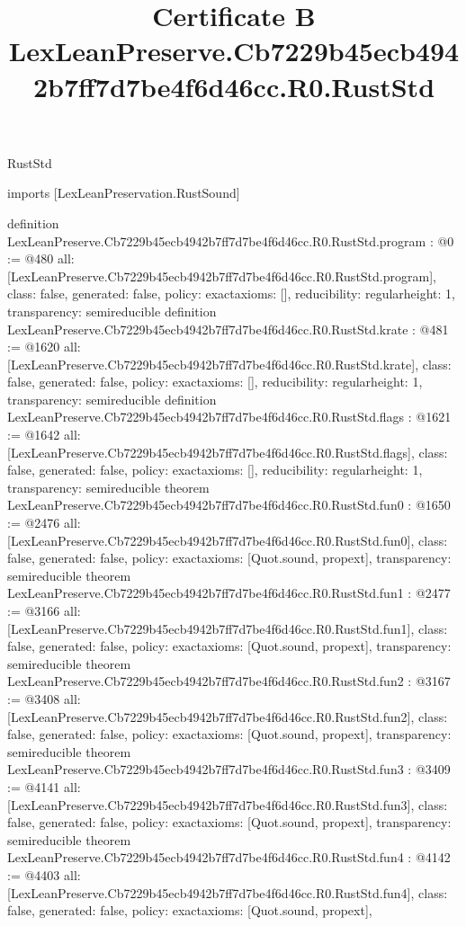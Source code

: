 \begin{lexlean}{RustStd}
\title{Certificate B LexLeanPreserve.Cb7229b45ecb4942b7ff7d7be4f6d46cc.R0.RustStd}
\begin{coremodule}
imports [LexLeanPreservation.RustSound]

definition LexLeanPreserve.Cb7229b45ecb4942b7ff7d7be4f6d46cc.R0.RustStd.program : @0 := @480 {
  all: [LexLeanPreserve.Cb7229b45ecb4942b7ff7d7be4f6d46cc.R0.RustStd.program],
  class: false,
  generated: false,
  policy: exact{axioms: []},
  reducibility: regular{height: 1},
  transparency: semireducible
}
definition LexLeanPreserve.Cb7229b45ecb4942b7ff7d7be4f6d46cc.R0.RustStd.krate : @481 := @1620 {
  all: [LexLeanPreserve.Cb7229b45ecb4942b7ff7d7be4f6d46cc.R0.RustStd.krate],
  class: false,
  generated: false,
  policy: exact{axioms: []},
  reducibility: regular{height: 1},
  transparency: semireducible
}
definition LexLeanPreserve.Cb7229b45ecb4942b7ff7d7be4f6d46cc.R0.RustStd.flags : @1621 := @1642 {
  all: [LexLeanPreserve.Cb7229b45ecb4942b7ff7d7be4f6d46cc.R0.RustStd.flags],
  class: false,
  generated: false,
  policy: exact{axioms: []},
  reducibility: regular{height: 1},
  transparency: semireducible
}
theorem LexLeanPreserve.Cb7229b45ecb4942b7ff7d7be4f6d46cc.R0.RustStd.fun0 : @1650 := @2476 {
  all: [LexLeanPreserve.Cb7229b45ecb4942b7ff7d7be4f6d46cc.R0.RustStd.fun0],
  class: false,
  generated: false,
  policy: exact{axioms: [Quot.sound, propext]},
  transparency: semireducible
}
theorem LexLeanPreserve.Cb7229b45ecb4942b7ff7d7be4f6d46cc.R0.RustStd.fun1 : @2477 := @3166 {
  all: [LexLeanPreserve.Cb7229b45ecb4942b7ff7d7be4f6d46cc.R0.RustStd.fun1],
  class: false,
  generated: false,
  policy: exact{axioms: [Quot.sound, propext]},
  transparency: semireducible
}
theorem LexLeanPreserve.Cb7229b45ecb4942b7ff7d7be4f6d46cc.R0.RustStd.fun2 : @3167 := @3408 {
  all: [LexLeanPreserve.Cb7229b45ecb4942b7ff7d7be4f6d46cc.R0.RustStd.fun2],
  class: false,
  generated: false,
  policy: exact{axioms: [Quot.sound, propext]},
  transparency: semireducible
}
theorem LexLeanPreserve.Cb7229b45ecb4942b7ff7d7be4f6d46cc.R0.RustStd.fun3 : @3409 := @4141 {
  all: [LexLeanPreserve.Cb7229b45ecb4942b7ff7d7be4f6d46cc.R0.RustStd.fun3],
  class: false,
  generated: false,
  policy: exact{axioms: [Quot.sound, propext]},
  transparency: semireducible
}
theorem LexLeanPreserve.Cb7229b45ecb4942b7ff7d7be4f6d46cc.R0.RustStd.fun4 : @4142 := @4403 {
  all: [LexLeanPreserve.Cb7229b45ecb4942b7ff7d7be4f6d46cc.R0.RustStd.fun4],
  class: false,
  generated: false,
  policy: exact{axioms: [Quot.sound, propext]},
}
\end{coremodule}
\end{lexlean}
